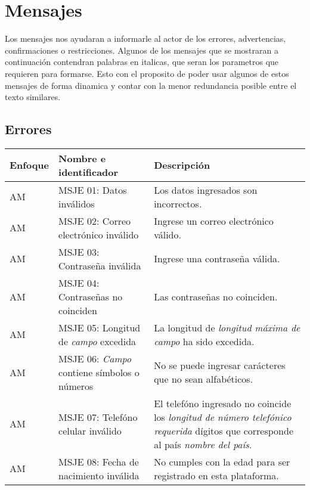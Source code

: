 \section{Mensajes}
Los mensajes nos ayudaran a informarle al actor de los errores, advertencias, confirmaciones o restricciones. Algunos de los mensajes que se mostraran a continuación contendran palabras en italicas, que seran los parametros que requieren para formarse. Esto con el proposito de poder usar algunos de estos mensajes de forma dinamica y contar con la menor redundancia posible entre el texto similares.
\subsection{Errores}
  \begin{center}
   \begin{tabular}{|p{1.5cm}|p{4cm}|p{7cm}|}
     \hline
       \textbf{Enfoque}&\textbf{Nombre e identificador} & \textbf{Descripción} \\ \hline
           \label{msje_01} AM & MSJE 01: Datos inválidos & Los datos ingresados son incorrectos. \\ \hline
           \label{msje_02} AM & MSJE 02: Correo electrónico inválido & Ingrese un correo electrónico válido. \\ \hline
           \label{msje_03} AM & MSJE 03: Contraseña inválida & Ingrese una contraseña válida. \\ \hline
           \label{msje_04} AM & MSJE 04: Contraseñas no coinciden & Las contraseñas no coinciden.\\ \hline
           \label{msje_05} AM & MSJE 05: Longitud de \textit{campo} excedida & La longitud de \textit{longitud máxima de campo} ha sido excedida. \\ \hline
           \label{msje_06} AM & MSJE 06: \textit{Campo} contiene símbolos o números & No se puede ingresar carácteres que no sean alfabéticos.\\ \hline
           \label{msje_07} AM & MSJE 07: Telefóno celular inválido & El telefóno ingresado no coincide los \textit{longitud de número telefónico requerida} dígitos que corresponde al país \textit{nombre del país}.\\ \hline
           \label{msje_08} AM & MSJE 08: Fecha de nacimiento inválida & No cumples con la edad para ser registrado en esta plataforma.\\ \hline
   \end{tabular}
    \label{tab:msje}
 \end{center}  

